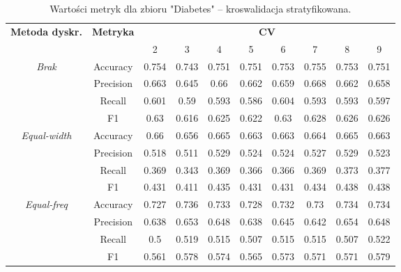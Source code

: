 \begin{table}[H]
\center
    \caption{Wartości metryk dla zbioru "Diabetes" -- kroswalidacja stratyfikowana.}
    \begin{tabular}{|c|c|c|c|c|c|c|c|c|c|}
        \hline
        \multirow{2}{*}{\textbf{Metoda dyskr.}} & \multirow{2}{*}{\textbf{Metryka}} & \multicolumn{8}{|c|}{\textbf{CV}} \\ \cline{3-10}
                        &  & 2 & 3 & 4 & 5 & 6 & 7 & 8 & 9 \\ \hline
        \multirow{4}{*}{\textit{Brak}}  & Accuracy & 0.754 & 0.743 & 0.751 & 0.751 & 0.753 & 0.755 & 0.753 & 0.751 \\ \cline{2-10}
                                         & Precision & 0.663 & 0.645 & 0.66 & 0.662 & 0.659 & 0.668 & 0.662 & 0.658 \\ \cline{2-10}
                                         & Recall & 0.601 & 0.59 & 0.593 & 0.586 & 0.604 & 0.593 & 0.593 & 0.597 \\ \cline{2-10}
                                         & F1 & 0.63 & 0.616 & 0.625 & 0.622 & 0.63 & 0.628 & 0.626 & 0.626 \\ \hline \hline


        \multirow{4}{*}{\textit{Equal-width}}  & Accuracy & 0.66 & 0.656 & 0.665 & 0.663 & 0.663 & 0.664 & 0.665 & 0.663 \\ \cline{2-10}
                                             & Precision & 0.518 & 0.511 & 0.529 & 0.524 & 0.524 & 0.527 & 0.529 & 0.523 \\ \cline{2-10}
                                             & Recall & 0.369 & 0.343 & 0.369 & 0.366 & 0.366 & 0.369 & 0.373 & 0.377 \\ \cline{2-10}
                                             & F1 & 0.431 & 0.411 & 0.435 & 0.431 & 0.431 & 0.434 & 0.438 & 0.438 \\ \hline \hline


        \multirow{4}{*}{\textit{Equal-freq}}  & Accuracy & 0.727 & 0.736 & 0.733 & 0.728 & 0.732 & 0.73 & 0.734 & 0.734 \\ \cline{2-10}
                                             & Precision & 0.638 & 0.653 & 0.648 & 0.638 & 0.645 & 0.642 & 0.654 & 0.648 \\ \cline{2-10}
                                             & Recall & 0.5 & 0.519 & 0.515 & 0.507 & 0.515 & 0.515 & 0.507 & 0.522 \\ \cline{2-10}
                                             & F1 & 0.561 & 0.578 & 0.574 & 0.565 & 0.573 & 0.571 & 0.571 & 0.579 \\ \hline \hline



\end{tabular}
\end{table}
